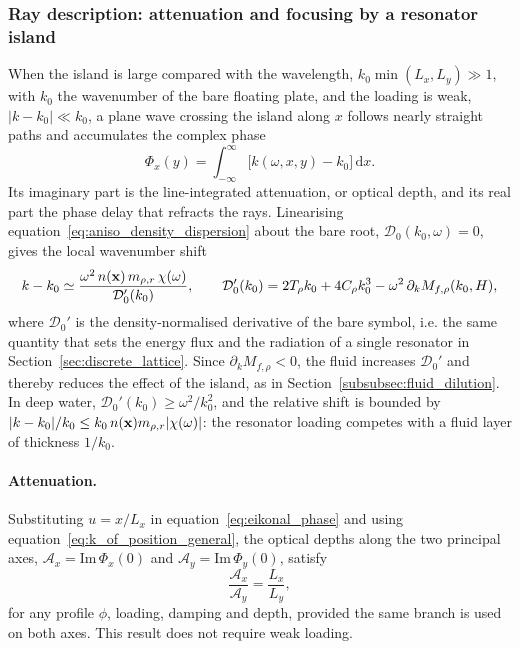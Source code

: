 \subsubsection{Ray description: attenuation and focusing by a resonator island}\label{subsubsec:aniso_rays}
When the island is large compared with the wavelength, $k_0\min(L_x,L_y)\gg1$, with $k_0$ the wavenumber of the bare floating plate, and the loading is weak, $|k-k_0|\ll k_0$, a plane wave crossing the island along $x$ follows nearly straight paths and accumulates the complex phase
\begin{equation}\label{eq:eikonal_phase}
    \Phi_x(y)=\int_{-\infty}^{\infty}\big[k(\omega,x,y)-k_0\big]\,\mathrm{d}x .
\end{equation}
Its imaginary part is the line-integrated attenuation, or optical depth, and its real part the phase delay that refracts the rays. Linearising equation~\eqref{eq:aniso_density_dispersion} about the bare root, $\mathcal D_0(k_0,\omega)=0$, gives the local wavenumber shift
\begin{equation}\label{eq:weak_dk}
    k-k_0\simeq\frac{\omega^2\,n(\mathbf{x})\,m_{\rho,r}\,\chi(\omega)}{\mathcal D_0'(k_0)},
    \qquad
    \mathcal D_0'(k_0)=2T_\rho k_0+4C_\rho k_0^3-\omega^2\,\partial_kM_{f,\rho}(k_0,H),
\end{equation}
where $\mathcal D_0'$ is the density-normalised derivative of the bare symbol, i.e. the same quantity that sets the energy flux and the radiation of a single resonator in Section~\ref{sec:discrete_lattice}. Since $\partial_kM_{f,\rho}<0$, the fluid increases $\mathcal D_0'$ and thereby reduces the effect of the island, as in Section~\ref{subsubsec:fluid_dilution}. In deep water, $\mathcal D_0'(k_0)\ge\omega^2/k_0^2$, and the relative shift is bounded by $|k-k_0|/k_0\le k_0\,n(\mathbf{x})m_{\rho,r}|\chi(\omega)|$: the resonator loading competes with a fluid layer of thickness $1/k_0$.

\paragraph{Attenuation.} Substituting $u=x/L_x$ in equation~\eqref{eq:eikonal_phase} and using equation~\eqref{eq:k_of_position_general}, the optical depths along the two principal axes, $\mathcal A_x=\mathrm{Im}\,\Phi_x(0)$ and $\mathcal A_y=\mathrm{Im}\,\Phi_y(0)$, satisfy
\begin{equation}\label{eq:aspect_ratio_law}
    \frac{\mathcal A_x}{\mathcal A_y} = \frac{L_x}{L_y},
\end{equation}
for any profile $\phi$, loading, damping and depth, provided the same branch is used on both axes. This result does not require weak loading.

